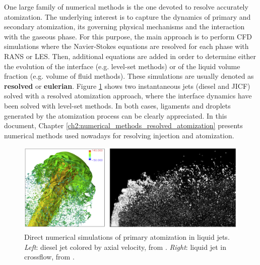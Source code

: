 One large family of numerical methods is the one devoted to resolve accurately atomization. The underlying interest is to capture the dynamics of primary and secondary atomization, its governing physical mechanisms and the interaction with the gaseous phase. For this purpose, the main approach is to perform CFD simulations where the Navier-Stokes equations are resolved for each phase with RANS or LES. Then, additional equations are added in order to determine either the evolution of the interface (e.g. level-set methods) or of the liquid volume fraction (e.g. volume of fluid methods). These simulations are usually denoted as \textbf{resolved} or \textbf{eulerian}. Figure \ref{fig:DNS_simulations_jets} shows two instantaneous jets (diesel and JICF) solved with a resolved atomization approach, where the interface dynamics have been solved with level-set methods. In both cases, ligaments and droplets generated by the atomization process can be clearly appreciated. In this document, Chapter \ref{ch2:numerical_methods_resolved_atomization} presents numerical methods used nowadays for resolving injection and atomization.

\begin{figure}[h!]
	\centering
   \includegraphics[scale=0.4]{./part0_intro/jets_DNS_simulations}
	\caption[Direct numerical simulations of primary atomization in liquid jets.]{Direct numerical simulations of primary atomization in liquid jets. \textsl{Left}: diesel jet colored by axial velocity, from . \textsl{Right}: liquid jet in crossflow, from .}
	\label{fig:DNS_simulations_jets}
\end{figure}


